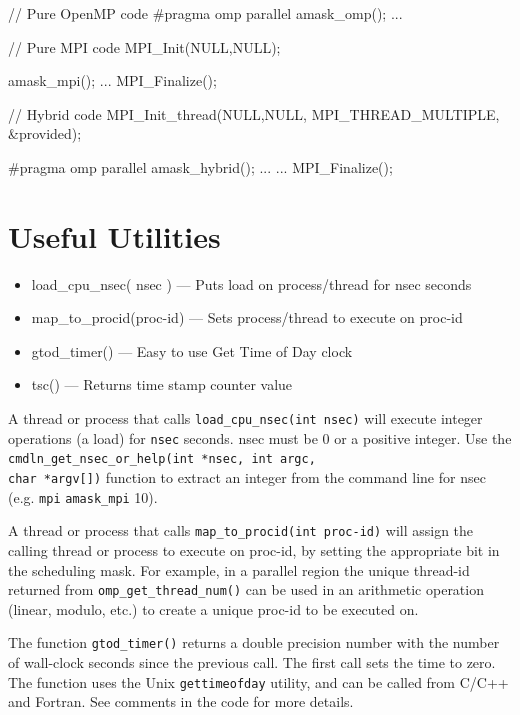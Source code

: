\documentclass[10pt,a4paper]{report}
\begin{document}
\begin{code}[frame=single,breaklines=true,numbers=left,language=C,caption=Invoking mask report inside code\label{code:apimask}]
 // Pure OpenMP code
    #pragma omp parallel
    {
       amask_omp();
     ...
    }

 // Pure MPI code
    MPI_Init(NULL,NULL);

       amask_mpi();
    ...
    MPI_Finalize();

 // Hybrid code
    MPI_Init_thread(NULL,NULL, MPI_THREAD_MULTIPLE, &provided);

   #pragma omp parallel
   {
      amask_hybrid();
      ...
   }
   ...
   MPI_Finalize();
\end{code}


\section{Useful Utilities}
\begin{itemize}
\item load\_cpu\_nsec( nsec )   --- Puts load on process/thread for nsec seconds
\item map\_to\_procid(proc-id)   --- Sets process/thread to execute on proc-id
\item gtod\_timer()           --- Easy to use Get Time of Day clock
\item tsc() --- Returns time stamp counter value
\end{itemize}

A thread or process that calls \verb+load_cpu_nsec(int nsec)+ will execute integer
operations (a load) for \verb+nsec+ seconds.  nsec must be 0 or a positive integer.  Use the
\verb+cmdln_get_nsec_or_help(int *nsec, int argc,+ \\
\verb+char *argv[])+ function to extract an
integer from the command line for nsec (e.g. \verb+mpi+ \verb+amask_mpi+ 10).


A thread or process that calls \verb+map_to_procid(int proc-id)+ will assign the
calling thread or process to execute on proc-id, by setting the appropriate
bit in the scheduling mask.  For example, in a parallel region the unique
thread-id returned from \verb+omp_get_thread_num()+ can be used in an
arithmetic operation (linear, modulo, etc.) to create a unique proc-id to be executed on. 

The function \verb+gtod_timer()+ returns a double precision number with the number
of wall-clock seconds since the previous call.  The first call sets the time
to zero. The function uses the Unix \verb+gettimeofday+ utility, and  can be called from 
C/C++ and Fortran.  See comments in the code for
more details.
\end{document}
